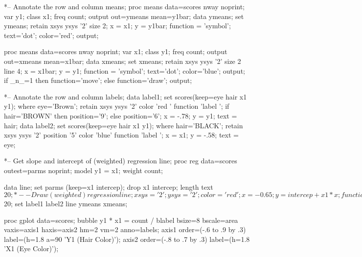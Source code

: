 \begin{listing}
*-- Annotate the row and column means;
proc means data=scores nway noprint;
   var y1;
   class x1;
   freq count;
   output out=ymeans mean=y1bar;
data ymeans;
   set ymeans;
   retain xsys  ysys '2' size 2;
   x = x1; y = y1bar;
   function = 'symbol'; text='dot'; color='red';  output;

proc means data=scores nway noprint;
   var x1;
   class y1;
   freq count;
   output out=xmeans mean=x1bar;
data xmeans;
   set xmeans;
   retain xsys  ysys '2' size 2 line 4;
   x = x1bar; y = y1;
   function = 'symbol'; text='dot'; color='blue';  output;
   if _n_=1 then function='move';
      else function='draw';
   output;

*-- Annotate the row and column labels;
data label1;
   set scores(keep=eye hair x1 y1);
   where eye='Brown';
   retain xsys ysys '2' color 'red    ' function 'label   ';
   if hair='BROWN' then position='9';
      else position='6';
   x = -.78; y = y1; text = hair;
data label2;
   set scores(keep=eye hair x1 y1);
   where hair='BLACK';
   retain xsys ysys '2' position '5' color 'blue' function 'label   ';
   x = x1; y = -.58; text = eye;

*-- Get slope and intercept of (weighted) regression line;
proc reg data=scores outest=parms noprint;
   model y1 = x1;
   weight count;

data line;
   set parms (keep=x1 intercep);
   drop x1 intercep;
   length text $20;
   
   *-- Draw (weighted) regression line;
   xsys='2'; ysys='2'; color='red   ';
   x=-0.65; y = intercep + x1 * x; function='MOVE    '; output;
   x= 0.65; y = intercep + x1 * x; function='DRAW    '; output;
   x= 0.35; y = intercep + x1 * x; function='LABEL   '; color='black';
   angle = atan(x1) * (45/atan(1)); position='2';
   text = 'Y1 = 0 + ' || put(x1,6.3) || ' X1';  output;
   
*-- Combine the annotate data sets;
data labels;
   length text $20;
   set label1 label2 line ymeans xmeans;

proc gplot data=scores;
   bubble y1 * x1 = count / 
      blabel bsize=8 bscale=area
      vaxis=axis1 haxis=axis2 hm=2 vm=2 anno=labels;
   axis1 order=(-.6 to .9 by .3) label=(h=1.8 a=90 'Y1 (Hair Color)');
   axis2 order=(-.8 to .7 by .3) label=(h=1.8      'X1 (Eye Color)');
   \end{listing}
